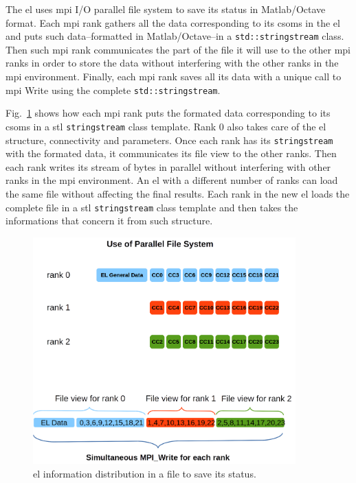 {The \gls{el} uses \gls{mpi} I/O parallel file system to save its status in Matlab/Octave format. Each \gls{mpi} rank gathers all the data corresponding to its \glspl{csom} in the \gls{el} and puts such data--formatted in Matlab/Octave--in a \texttt{std::stringstream} class. Then such \gls{mpi} rank communicates the part of the file it will use to the other \gls{mpi} ranks in order to store the data without interfering with the other ranks in the \gls{mpi} environment. Finally, each \gls{mpi} rank saves all its data with a unique call to \gls{mpi} Write using the complete \texttt{std::stringstream}.

Fig.~\ref{fig:MPI_IO} shows how each \gls{mpi} rank puts the formated data corresponding to its \glspl{csom} in a \gls{stl} \texttt{stringstream} class template. Rank 0 also takes care of the \gls{el} structure, connectivity and parameters. Once each rank has its \texttt{stringstream} with the formated data, it communicates its file view to the other ranks. Then each rank writes its stream of bytes in parallel without interfering with other ranks in the \gls{mpi} environment. An \gls{el} with a different number of ranks can load the same file without affecting the final results. Each rank in the new \gls{el} loads the complete file in a \gls{stl} \texttt{stringstream} class template and then takes the informations that concern it from such structure.

\begin{figure}[h!]
    \centering
    \includegraphics[width=0.9\textwidth]{MPI_IO.png}
    \caption{\gls{el} information distribution in a file to save its status.}
    \label{fig:MPI_IO}
\end{figure}

}
